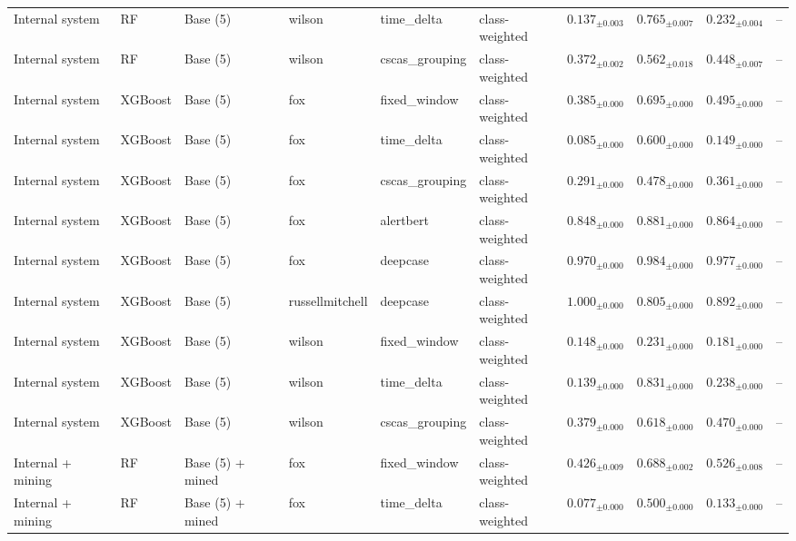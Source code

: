 \begin{longtable}{llllllcccc}
\addlinespace
Internal system & RF & Base (5) & wilson & time\_delta & class-weighted & $0.137_{\pm 0.003}$ & $0.765_{\pm 0.007}$ & $0.232_{\pm 0.004}$ & -- \\
\addlinespace
Internal system & RF & Base (5) & wilson & cscas\_grouping & class-weighted & $0.372_{\pm 0.002}$ & $0.562_{\pm 0.018}$ & $0.448_{\pm 0.007}$ & -- \\
\addlinespace
Internal system & XGBoost & Base (5) & fox & fixed\_window & class-weighted & $0.385_{\pm 0.000}$ & $0.695_{\pm 0.000}$ & $0.495_{\pm 0.000}$ & -- \\
\addlinespace
Internal system & XGBoost & Base (5) & fox & time\_delta & class-weighted & $0.085_{\pm 0.000}$ & $0.600_{\pm 0.000}$ & $0.149_{\pm 0.000}$ & -- \\
\addlinespace
Internal system & XGBoost & Base (5) & fox & cscas\_grouping & class-weighted & $0.291_{\pm 0.000}$ & $0.478_{\pm 0.000}$ & $0.361_{\pm 0.000}$ & -- \\
\addlinespace
Internal system & XGBoost & Base (5) & fox & alertbert & class-weighted & $0.848_{\pm 0.000}$ & $0.881_{\pm 0.000}$ & $0.864_{\pm 0.000}$ & -- \\
\addlinespace
Internal system & XGBoost & Base (5) & fox & deepcase & class-weighted & $0.970_{\pm 0.000}$ & $0.984_{\pm 0.000}$ & $0.977_{\pm 0.000}$ & -- \\
\addlinespace
Internal system & XGBoost & Base (5) & russellmitchell & deepcase & class-weighted & $1.000_{\pm 0.000}$ & $0.805_{\pm 0.000}$ & $0.892_{\pm 0.000}$ & -- \\
\addlinespace
Internal system & XGBoost & Base (5) & wilson & fixed\_window & class-weighted & $0.148_{\pm 0.000}$ & $0.231_{\pm 0.000}$ & $0.181_{\pm 0.000}$ & -- \\
\addlinespace
Internal system & XGBoost & Base (5) & wilson & time\_delta & class-weighted & $0.139_{\pm 0.000}$ & $0.831_{\pm 0.000}$ & $0.238_{\pm 0.000}$ & -- \\
\addlinespace
Internal system & XGBoost & Base (5) & wilson & cscas\_grouping & class-weighted & $0.379_{\pm 0.000}$ & $0.618_{\pm 0.000}$ & $0.470_{\pm 0.000}$ & -- \\
\midrule
Internal + mining & RF & Base (5) + mined & fox & fixed\_window & class-weighted & $0.426_{\pm 0.009}$ & $0.688_{\pm 0.002}$ & $0.526_{\pm 0.008}$ & -- \\
\addlinespace
Internal + mining & RF & Base (5) + mined & fox & time\_delta & class-weighted & $0.077_{\pm 0.000}$ & $0.500_{\pm 0.000}$ & $0.133_{\pm 0.000}$ & -- \\

\end{longtable}
